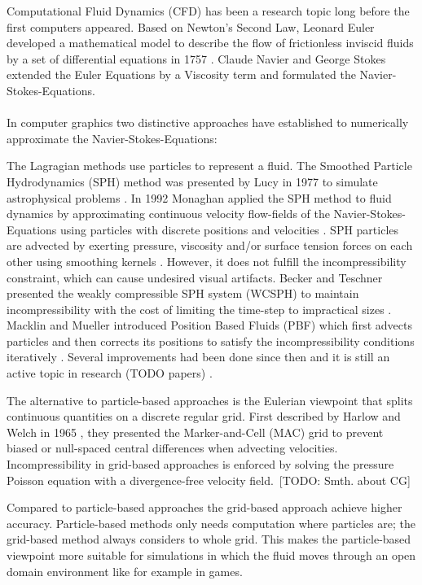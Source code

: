 Computational Fluid Dynamics (CFD) has been a research topic long before the first computers appeared. Based on Newton's Second Law, Leonard Euler developed a mathematical model to describe the flow of frictionless inviscid fluids by a set of differential equations in 1757 \parencite{euler1757principes}. Claude Navier and George Stokes extended the Euler Equations by a Viscosity term and formulated the Navier-Stokes-Equations. \\\\
In computer graphics two distinctive approaches have established to numerically approximate the Navier-Stokes-Equations: 
\par The Lagragian methods use particles to represent a fluid. The Smoothed Particle Hydrodynamics (SPH) method was presented by Lucy in 1977 to simulate astrophysical problems \parencite{lucy1977numerical}. In 1992 Monaghan applied the SPH method to fluid dynamics by approximating continuous velocity flow-fields of the Navier-Stokes-Equations using particles with discrete positions and velocities \parencite{monaghan1992smoothed}. SPH particles are advected by exerting pressure, viscosity and/or surface tension forces on each other using smoothing kernels \parencite{muller2003particle}. However, it does not fulfill the incompressibility constraint, which can cause undesired visual artifacts. Becker and Teschner presented the weakly compressible SPH system (WCSPH) to maintain incompressibility with the cost of limiting the time-step to impractical sizes \parencite{becker2007weakly}. Macklin and Mueller introduced Position Based Fluids (PBF) which first advects particles and then corrects its positions to satisfy the incompressibility conditions iteratively \parencite{macklin2013position}. Several improvements had been done since then and it is still an active topic in research (TODO papers) \parencite{morikawaimprovements}.
\par The alternative to particle-based approaches is the Eulerian viewpoint that splits continuous quantities on a discrete regular grid. First described by Harlow and Welch in 1965 \parencite{harlow1965numerical}, they presented the Marker-and-Cell (MAC) grid to prevent biased or null-spaced central differences when advecting velocities. Incompressibility in grid-based approaches is enforced by solving the pressure Poisson equation with a divergence-free velocity field. [TODO: Smth. about CG]
\par Compared to particle-based approaches the grid-based approach achieve higher accuracy. Particle-based methods only needs computation where particles are; the grid-based method always considers to whole grid. This makes the particle-based viewpoint more suitable for simulations in which the fluid moves through an open domain environment like for example in games. 
